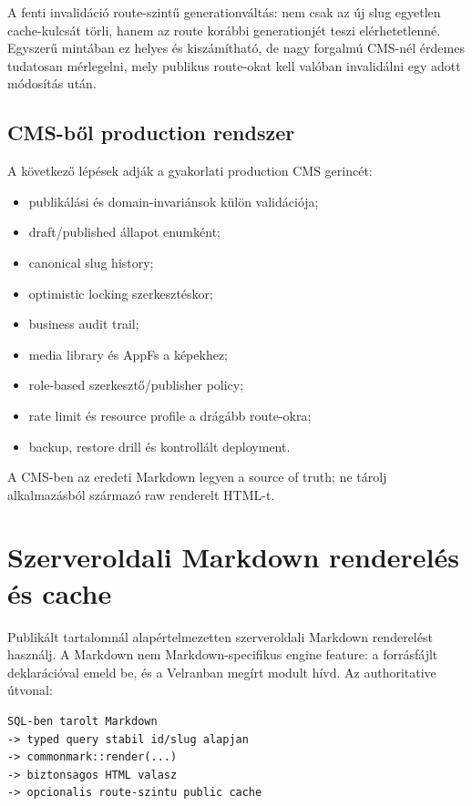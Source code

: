 A fenti invalidáció route-szintű generationváltás: nem csak az új slug egyetlen cache-kulcsát törli, hanem az  route korábbi generationjét teszi elérhetetlenné. Egyszerű mintában ez helyes és kiszámítható, de nagy forgalmú CMS-nél érdemes tudatosan mérlegelni, mely publikus route-okat kell valóban invalidálni egy adott módosítás után.

\subsection*{CMS-ből production rendszer}

A következő lépések adják a gyakorlati production CMS gerincét:

\begin{itemize}
  \item publikálási és domain-invariánsok külön validációja;
  \item draft/published állapot enumként;
  \item canonical slug history;
  \item optimistic locking szerkesztéskor;
  \item business audit trail;
  \item media library és AppFs a képekhez;
  \item role-based szerkesztő/publisher policy;
  \item rate limit és resource profile a drágább route-okra;
  \item backup, restore drill és kontrollált deployment.
\end{itemize}

A CMS-ben az eredeti Markdown legyen a source of truth; ne tárolj alkalmazásból származó raw renderelt HTML-t.


\section{Szerveroldali Markdown renderelés és cache}

Publikált tartalomnál alapértelmezetten szerveroldali Markdown renderelést használj. A Markdown nem Markdown-specifikus engine feature: a  forrásfájlt  deklarációval emeld be, és a Velranban megírt modult hívd. Az authoritative útvonal:

\begin{lstlisting}
SQL-ben tarolt Markdown
-> typed query stabil id/slug alapjan
-> commonmark::render(...)
-> biztonsagos HTML valasz
-> opcionalis route-szintu public cache
\end{lstlisting}

